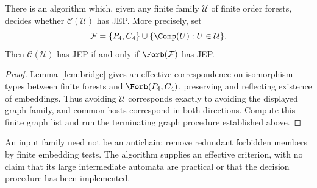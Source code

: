 \begin{theorem}\label{thm:decision}
There is an algorithm which, given any finite family $\mathcal U$ of
finite order forests, decides whether $\mathcal C(\mathcal U)$ has JEP.
More precisely, set
\[
 \mathcal F=\{P_4,C_4\}\cup\{\Comp(U):U\in\mathcal U\}.
\]
Then $\mathcal C(\mathcal U)$ has JEP if and only if $\Forb(\mathcal F)$
has JEP.
\end{theorem}
\begin{proof}
Lemma~\ref{lem:bridge} gives an effective correspondence on isomorphism
types between finite forests and $\Forb(P_4,C_4)$, preserving and
reflecting existence of embeddings. Thus avoiding $\mathcal U$
corresponds exactly to avoiding the displayed graph family, and common
hosts correspond in both directions. Compute this finite graph list
and run the terminating graph procedure established above.
\end{proof}

An input family need not be an antichain: remove redundant forbidden
members by finite embedding tests. The algorithm supplies an effective
criterion, with no claim that its large intermediate automata are
practical or that the decision procedure has been implemented.
